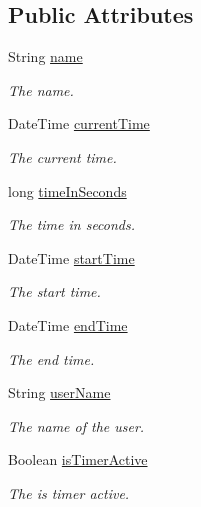 \subsection*{Public Attributes}
\begin{DoxyCompactItemize}
\item 
String \hyperlink{classcom_1_1shephertz_1_1app42_1_1paas_1_1sdk_1_1csharp_1_1timer_1_1_timer_aae87b9667c3ecc5e46afcb073be757a6}{name}
\begin{DoxyCompactList}\small\item\em The name. \end{DoxyCompactList}\item 
Date\+Time \hyperlink{classcom_1_1shephertz_1_1app42_1_1paas_1_1sdk_1_1csharp_1_1timer_1_1_timer_a2fc22d08c6ae6f30d4cfd6315077392d}{current\+Time}
\begin{DoxyCompactList}\small\item\em The current time. \end{DoxyCompactList}\item 
long \hyperlink{classcom_1_1shephertz_1_1app42_1_1paas_1_1sdk_1_1csharp_1_1timer_1_1_timer_aa3182edb844b47f63267f2b68b022a43}{time\+In\+Seconds}
\begin{DoxyCompactList}\small\item\em The time in seconds. \end{DoxyCompactList}\item 
Date\+Time \hyperlink{classcom_1_1shephertz_1_1app42_1_1paas_1_1sdk_1_1csharp_1_1timer_1_1_timer_aae095552c437642003d8404fe624f433}{start\+Time}
\begin{DoxyCompactList}\small\item\em The start time. \end{DoxyCompactList}\item 
Date\+Time \hyperlink{classcom_1_1shephertz_1_1app42_1_1paas_1_1sdk_1_1csharp_1_1timer_1_1_timer_a4ab4fc1121493a5f2c467f7e4421fe5b}{end\+Time}
\begin{DoxyCompactList}\small\item\em The end time. \end{DoxyCompactList}\item 
String \hyperlink{classcom_1_1shephertz_1_1app42_1_1paas_1_1sdk_1_1csharp_1_1timer_1_1_timer_a07a192f4cffc6645d5697f986ce710de}{user\+Name}
\begin{DoxyCompactList}\small\item\em The name of the user. \end{DoxyCompactList}\item 
Boolean \hyperlink{classcom_1_1shephertz_1_1app42_1_1paas_1_1sdk_1_1csharp_1_1timer_1_1_timer_a6e75c88965a37bb7fdf9cc1f73f505dd}{is\+Timer\+Active}
\begin{DoxyCompactList}\small\item\em The is timer active. \end{DoxyCompactList}\end{DoxyCompactItemize}


